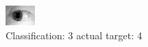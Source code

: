 \begin{figure}[h!]
\begin{center}
\includegraphics[width=0.60\columnwidth]{figures/ID1224_class_3_target_4.png}
\end{center}
\caption{ Classification: 3 actual target: 4}
\label{fig:ID1224_class_3_target_4}
\end{figure}
